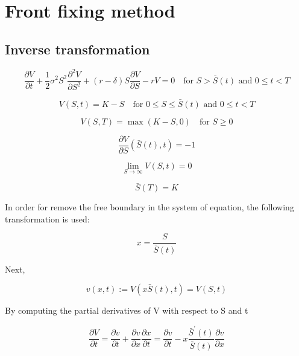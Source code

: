 \section{Front fixing method}

\subsection{Inverse transformation}

\begin{equation}
    \frac{\partial{V}}{\partial{t}} + \frac{1}{2}\sigma^{2} S^2 \frac{\partial^2{V}}{\partial{S^2}} + (r - \delta) S \frac{\partial{V}}{\partial{S}} - rV = 0 \quad \text{for $S > \bar{S}(t)$ and $0 \le t < T$}
\end{equation}

\begin{equation}
    V(S, t) = K - S \quad  \text{for $0 \le S \le \bar{S}(t)$ and $0 \le t < T$}
\end{equation}

\begin{equation}
    V(S, T) = \max(K - S, 0) \quad \text{for $S \ge 0$}
\end{equation}

\begin{equation}
    \frac{\partial{V}}{\partial{S}}(\bar{S}(t), t) = -1
\end{equation}

\begin{equation}
    \lim_{S\rightarrow \infty} V(S, t) = 0
\end{equation}

\begin{equation}
    \bar{S}(T) = K
\end{equation}

In order for remove the free boundary in the system of equation, the following 
transformation is used:

\begin{equation}
    x = \frac{S}{\bar{S}(t)}
\end{equation}

Next,

\begin{equation}
    v(x, t) := V(x\bar{S}(t), t) = V(S, t)
\end{equation}


By computing the partial derivatives of V with respect to S and t

\begin{equation}
    \frac{\partial{V}}{\partial{t}} =  \frac{\partial{v}}{\partial{t}} + \frac{\partial{v}}{\partial{x}} \frac{\partial{x}}{\partial{t}} 
    = \frac{\partial{v}}{\partial{t}} - x\frac{\bar{S}^\prime(t)}{\bar{S}(t)}\frac{\partial{v}}{\partial{x}} 
\end{equation}

